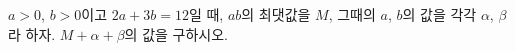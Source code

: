 $a>0$, $b>0$이고 $2a+3b=12$일 때, $ab$의 최댓값을 $M$, 그때의 $a$, $b$의 값을 각각 $\alpha$, $\beta$라 하자. $M+\alpha+\beta$의 값을 구하시오.
